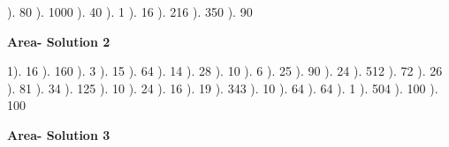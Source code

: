 \documentclass{article}%
\begin{document}
). 80%
). 1000%
). 40%
). 1%
). 16%
). 216%
). 350%
). 90%
\newline%
\newpage%
\large%
\begin{center}%
\textbf{Area- Solution 2}%
\newline%
\end{center} \normalsize%
1). 16%
). 160%
). 3%
). 15%
). 64%
). 14%
). 28%
). 10%
). 6%
). 25%
). 90%
). 24%
). 512%
). 72%
). 26%
). 81%
). 34%
). 125%
). 10%
). 24%
). 16%
). 19%
). 343%
). 10%
). 64%
). 64%
). 1%
). 504%
). 100%
). 100%
\newline%
\newpage%
\large%
\begin{center}%
\textbf{Area- Solution 3}%
\newline%
\end{center} \normalsize%
\end{document}
